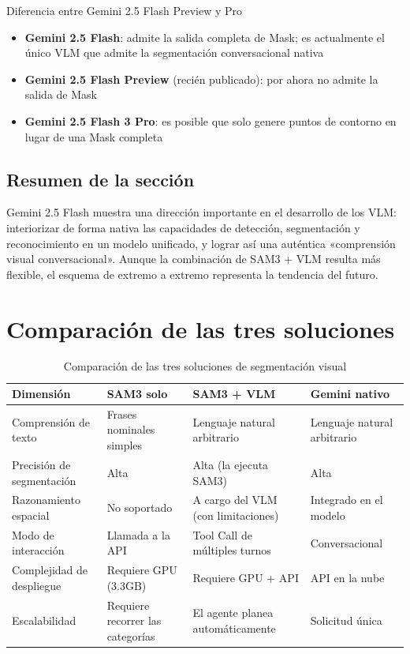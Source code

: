 \documentclass[a4paper]{article}
\begin{document}
\begin{knowledgebox}{Diferencia entre Gemini 2.5 Flash Preview y Pro}
\begin{itemize}
    \item \textbf{Gemini 2.5 Flash}: admite la salida completa de Mask; es actualmente el único VLM que admite la segmentación conversacional nativa
    \item \textbf{Gemini 2.5 Flash Preview} (recién publicado): por ahora no admite la salida de Mask
    \item \textbf{Gemini 2.5 Flash 3 Pro}: es posible que solo genere puntos de contorno en lugar de una Mask completa
\end{itemize}
\end{knowledgebox}

\subsection{Resumen de la sección}

Gemini 2.5 Flash muestra una dirección importante en el desarrollo de los VLM: interiorizar de forma nativa las capacidades de detección, segmentación y reconocimiento en un modelo unificado, y lograr así una auténtica «comprensión visual conversacional». Aunque la combinación de SAM3 + VLM resulta más flexible, el esquema de extremo a extremo representa la tendencia del futuro.


\section{Comparación de las tres soluciones}

\begin{table}[H]
\centering
\begin{tabular}{p{3cm}p{3.5cm}p{3.5cm}p{3.5cm}}
\toprule
\textbf{Dimensión} & \textbf{SAM3 solo} & \textbf{SAM3 + VLM} & \textbf{Gemini nativo} \\
\midrule
Comprensión de texto & Frases nominales simples & Lenguaje natural arbitrario & Lenguaje natural arbitrario \\
Precisión de segmentación & Alta & Alta (la ejecuta SAM3) & Alta \\
Razonamiento espacial & No soportado & A cargo del VLM (con limitaciones) & Integrado en el modelo \\
Modo de interacción & Llamada a la API & Tool Call de múltiples turnos & Conversacional \\
Complejidad de despliegue & Requiere GPU (3.3GB) & Requiere GPU + API & API en la nube \\
Escalabilidad & Requiere recorrer las categorías & El agente planea automáticamente & Solicitud única \\
\bottomrule
\end{tabular}
\caption{Comparación de las tres soluciones de segmentación visual}
\end{table}
\end{document}
